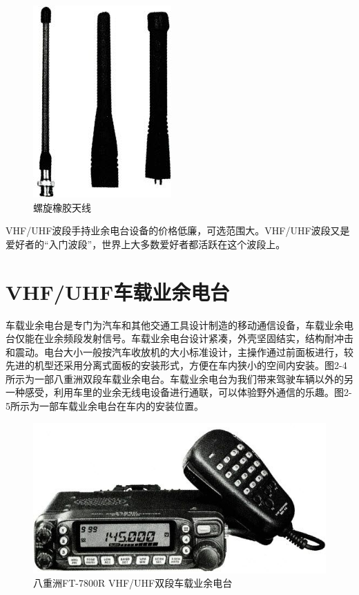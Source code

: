 \documentclass[12pt,UTF8]{ctexbook}
\begin{document}
\begin{figure}[htbp]
	\centering
	\includegraphics[width=0.7\linewidth]{20}
	\caption{螺旋橡胶天线}
	\label{fig:1}
\end{figure}

VHF/UHF波段手持业余电台设备的价格低廉，可选范围大。VHF/UHF波段又是爱好者的“入门波段”，世界上大多数爱好者都活跃在这个波段上。

\section{VHF/UHF车载业余电台}

车载业余电台是专门为汽车和其他交通工具设计制造的移动通信设备，车载业余电台仅能在业余频段发射信号。车载业余电台设计紧凑，外壳坚固结实，结构耐冲击和震动。电台大小一般按汽车收放机的大小标准设计，主操作通过前面板进行，较先进的机型还采用分离式面板的安装形式，方便在车内狭小的空间内安装。图2-4所示为一部八重洲双段车载业余电台。车载业余电台为我们带来驾驶车辆以外的另一种感受，利用车里的业余无线电设备进行通联，可以体验野外通信的乐趣。图2-5所示为一部车载业余电台在车内的安装位置。

\begin{figure}[htbp]
	\centering
	\includegraphics[width=0.7\linewidth]{21}
	\caption{八重洲FT-7800R VHF/UHF双段车载业余电台}
	\label{fig:1}
\end{figure}
\end{document}
